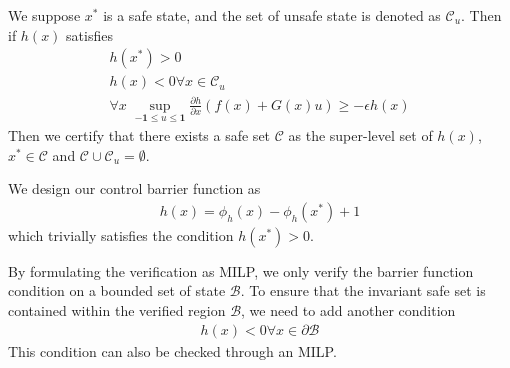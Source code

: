 \documentclass{article}
\begin{document}
We suppose $x^*$ is a safe state, and the set of unsafe state is denoted as $\mathcal{C}_u$. Then if $h(x)$ satisfies
\begin{subequations}
\begin{align}
	h(x^*) > 0\\
	h(x) < 0 \forall x\in\mathcal{C}_u\\
	\forall x\;\sup_{-\mathbf{1}\le u\le\mathbf{1}} \frac{\partial h}{\partial x}(f(x) + G(x)u) \ge -\epsilon h(x)
\end{align}
\end{subequations}
Then we certify that there exists a safe set $\mathcal{C}$ as the super-level set of $h(x)$, $x^*\in\mathcal{C}$ and $\mathcal{C} \cup \mathcal{C}_u=\emptyset$.

We design our control barrier function as
\begin{align}
	h(x) = \phi_h(x) - \phi_h(x^*) + 1
\end{align}
which trivially satisfies the condition $h(x^*) > 0$.

By formulating the verification as MILP, we only verify the barrier function condition on a bounded set of state $\mathcal{B}$. To ensure that the invariant safe set is contained within the verified region $\mathcal{B}$, we need to add another condition
\begin{align}
	h(x) < 0 \forall x \in \partial\mathcal{B}
\end{align}
This condition can also be checked through an MILP.
\end{document}
